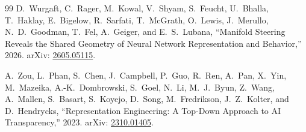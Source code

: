 \documentclass[11pt,a4paper]{article}
\theoremstyle{definition}
\begin{document}
\begin{thebibliography}{99}
D.~Wurgaft, C.~Rager, M.~Kowal, V.~Shyam, S.~Feucht, U.~Bhalla, T.~Haklay, E.~Bigelow, R.~Sarfati, T.~McGrath, O.~Lewis, J.~Merullo, N.~D.~Goodman, T.~Fel, A.~Geiger, and E.~S.~Lubana,
``Manifold Steering Reveals the Shared Geometry of Neural Network Representation and Behavior,'' 2026.
arXiv: \href{https://arxiv.org/abs/2605.05115}{2605.05115}.

A.~Zou, L.~Phan, S.~Chen, J.~Campbell, P.~Guo, R.~Ren, A.~Pan, X.~Yin, M.~Mazeika, A.-K.~Dombrowski, S.~Goel, N.~Li, M.~J.~Byun, Z.~Wang, A.~Mallen, S.~Basart, S.~Koyejo, D.~Song, M.~Fredrikson, J.~Z.~Kolter, and D.~Hendrycks,
``Representation Engineering: A Top-Down Approach to AI Transparency,'' 2023.
arXiv: \href{https://arxiv.org/abs/2310.01405}{2310.01405}.

\end{thebibliography}
\end{document}
